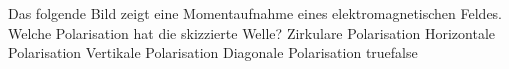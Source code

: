     {Das folgende Bild zeigt eine Momentaufnahme eines elektromagnetischen Feldes. Welche Polarisation hat die skizzierte Welle?}
    {Zirkulare Polarisation}
    {Horizontale Polarisation}
    {Vertikale Polarisation}
    {Diagonale Polarisation}
    {true}{false}